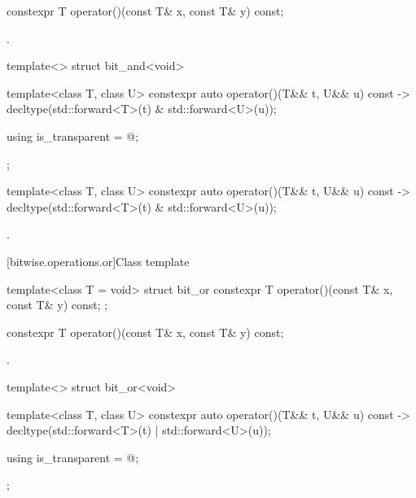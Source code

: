 %
\begin{itemdecl}
constexpr T operator()(const T& x, const T& y) const;
\end{itemdecl}

\begin{itemdescr}
\pnum
\returns
{}.
\end{itemdescr}

%
\begin{itemdecl}
template<> struct bit_and<void> {
  template<class T, class U> constexpr auto operator()(T&& t, U&& u) const
    -> decltype(std::forward<T>(t) & std::forward<U>(u));

  using is_transparent = @\unspec@;
};
\end{itemdecl}

%
\begin{itemdecl}
template<class T, class U> constexpr auto operator()(T&& t, U&& u) const
    -> decltype(std::forward<T>(t) & std::forward<U>(u));
\end{itemdecl}

\begin{itemdescr}
\pnum
\returns
{}.
\end{itemdescr}

[bitwise.operations.or]{Class template }

\begin{indexed}{
%
}
\begin{itemdecl}
template<class T = void> struct bit_or {
  constexpr T operator()(const T& x, const T& y) const;
};
\end{itemdecl}
\end{indexed}

%
\begin{itemdecl}
constexpr T operator()(const T& x, const T& y) const;
\end{itemdecl}

\begin{itemdescr}
\pnum
\returns
{}.
\end{itemdescr}

%
\begin{itemdecl}
template<> struct bit_or<void> {
  template<class T, class U> constexpr auto operator()(T&& t, U&& u) const
    -> decltype(std::forward<T>(t) | std::forward<U>(u));

  using is_transparent = @\unspec@;
};
\end{itemdecl}

